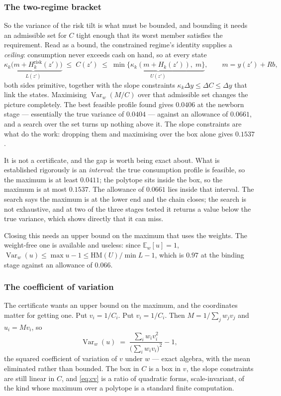 \subsubsection*{The two-regime bracket}

So the variance of the risk tilt is what must be bounded, and bounding it needs an admissible set
for $C$ tight enough that its worst member satisfies the requirement. Read as a bound, the constrained
regime's identity supplies a \emph{ceiling}: consumption never exceeds cash on hand, so at every
state
\[
  \underbrace{\kappa_k\bigl(m+H^{\mathrm{risk}}_k(z')\bigr)}_{L(z')}\;\le\;C(z')\;\le\;
  \underbrace{\min\bigl\{\kappa_k(m+H_k(z')),\;m\bigr\}}_{U(z')},\qquad m=y(z')+Rb,
\]
both sides primitive, together with the slope constraints $\kappa_k\Delta y\le\Delta C\le\Delta y$ that
link the states. Maximising $\operatorname{Var}_w(M/C)$ over that admissible set changes the picture
completely. The best feasible profile found gives $0.0406$ at the newborn stage --- essentially the
true variance of $0.0404$ --- against an allowance of $0.0661$, and a search over the set turns up
nothing above it. The slope constraints are what do the work: dropping them and maximising over the
box alone gives $0.1537$.

It is not a certificate, and the gap is worth being exact about. What is established rigorously is an
\emph{interval}: the true consumption profile is feasible, so the maximum is at least $0.0411$; the
polytope sits inside the box, so the maximum is at most $0.1537$. The allowance of $0.0661$ lies
inside that interval. The search says the maximum is at the lower end and the chain closes; the
search is not exhaustive, and at two of the three stages tested it returns a value below the true
variance, which shows directly that it can miss.

Closing this needs an upper bound on the maximum that uses the weights. The weight-free one is
available and useless: since $\mathbb E_w[u]=1$, $\operatorname{Var}_w(u)\le\max u-1\le
\mathrm{HM}(U)/\min L-1$, which is $0.97$ at the binding stage against an allowance of $0.066$.

\subsubsection*{The coefficient of variation}

The certificate wants an upper bound on the maximum, and the coordinates matter for getting one. Put $v_i=1/C_i$. Put $v_i=1/C_i$. Then $M=1/\sum_jw_jv_j$ and $u_i=Mv_i$, so
\begin{equation}\label{eq:cv}
  \operatorname{Var}_w(u)\;=\;\frac{\sum_iw_iv_i^{2}}{\bigl(\sum_iw_iv_i\bigr)^{2}}-1 ,
  \tag{CV}
\end{equation}
the squared coefficient of variation of $v$ under $w$ --- exact algebra, with the mean eliminated
rather than bounded. The box in $C$ is a box in $v$, the slope constraints are still linear in $C$,
and \eqref{eq:cv} is a ratio of quadratic forms, scale-invariant, of the kind whose maximum over a
polytope is a standard finite computation.

